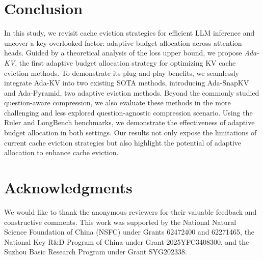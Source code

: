\section{Conclusion}


In this study, we revisit cache eviction strategies for efficient LLM inference and uncover a key overlooked factor: adaptive budget allocation across attention heads. Guided by a theoretical analysis of the loss upper bound, we propose \textit{Ada-KV}, the first adaptive budget allocation strategy for optimizing KV cache eviction methods. 
To demonstrate its plug-and-play benefits, we seamlessly integrate Ada-KV into two existing SOTA methods, introducing Ada-SnapKV and Ada-Pyramid, two adaptive eviction methods.
Beyond the commonly studied question-aware compression, we also evaluate these methods in the more challenging and less explored question-agnostic compression scenario. Using the Ruler and LongBench benchmarks, we demonstrate the effectiveness of adaptive budget allocation in both settings. Our results not only expose the limitations of current cache eviction strategies but also highlight the potential of adaptive allocation to enhance cache eviction.


\section*{Acknowledgments}
We would like to thank the anonymous reviewers for their valuable feedback and constructive comments. 
This work was supported by the National Natural Science Foundation of China (NSFC) under Grants 62472400 and 62271465, the National Key R\&D Program of China under Grant 2025YFC3408300, and the Suzhou Basic Research Program under Grant SYG202338.

